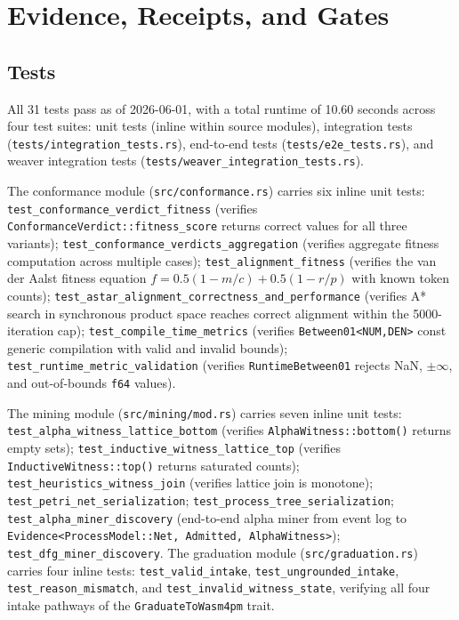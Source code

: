\section{Evidence, Receipts, and Gates}
\label{sec:sources-wasm4pm-evidence}

\subsection{Tests}
\label{sec:sources-wasm4pm-evidence-tests}

All 31 tests pass as of 2026-06-01, with a total runtime of 10.60 seconds across four test
suites: unit tests (inline within source modules), integration tests
(\texttt{tests/integration\_tests.rs}), end-to-end tests (\texttt{tests/e2e\_tests.rs}), and
weaver integration tests (\texttt{tests/weaver\_integration\_tests.rs}).

The conformance module (\texttt{src/conformance.rs}) carries six inline unit tests:
\texttt{test\_conformance\_verdict\_fitness} (verifies \texttt{ConformanceVerdict::fitness\_score}
returns correct values for all three variants);
\texttt{test\_conformance\_verdicts\_aggregation} (verifies aggregate fitness computation across
multiple cases); \texttt{test\_alignment\_fitness} (verifies the van der Aalst fitness equation
$f = 0.5(1 - m/c) + 0.5(1 - r/p)$ with known token counts);
\texttt{test\_astar\_alignment\_correctness\_and\_performance} (verifies A* search in
synchronous product space reaches correct alignment within the 5000-iteration cap);
\texttt{test\_compile\_time\_metrics} (verifies \texttt{Between01<NUM,DEN>} const generic
compilation with valid and invalid bounds); \texttt{test\_runtime\_metric\_validation} (verifies
\texttt{RuntimeBetween01} rejects NaN, $\pm\infty$, and out-of-bounds \texttt{f64} values).

The mining module (\texttt{src/mining/mod.rs}) carries seven inline unit tests:
\texttt{test\_alpha\_witness\_lattice\_bottom} (verifies \texttt{AlphaWitness::bottom()} returns
empty sets); \texttt{test\_inductive\_witness\_lattice\_top} (verifies
\texttt{InductiveWitness::top()} returns saturated counts); \texttt{test\_heuristics\_witness\_join}
(verifies lattice join is monotone); \texttt{test\_petri\_net\_serialization};
\texttt{test\_process\_tree\_serialization}; \texttt{test\_alpha\_miner\_discovery} (end-to-end
alpha miner from event log to \texttt{Evidence<ProcessModel::Net,~Admitted,~AlphaWitness>});
\texttt{test\_dfg\_miner\_discovery}. The graduation module (\texttt{src/graduation.rs}) carries
four inline tests: \texttt{test\_valid\_intake}, \texttt{test\_ungrounded\_intake},
\texttt{test\_reason\_mismatch}, and \texttt{test\_invalid\_witness\_state}, verifying all four
intake pathways of the \texttt{GraduateToWasm4pm} trait.

